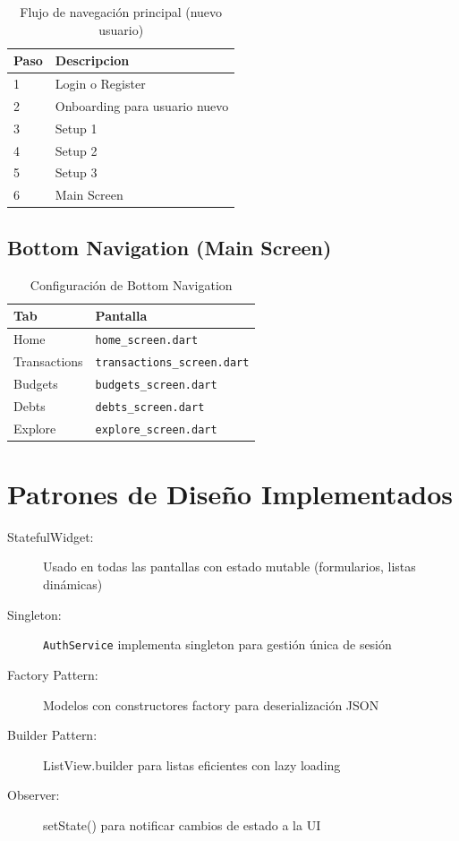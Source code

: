 \begin{table}[H]
\centering
\begin{tabularx}{\textwidth}{|l|X|}
\hline
\textbf{Paso} & \textbf{Descripcion} \\
\hline
1 & Login o Register \\
\hline
2 & Onboarding para usuario nuevo \\
\hline
3 & Setup 1 \\
\hline
4 & Setup 2 \\
\hline
5 & Setup 3 \\
\hline
6 & Main Screen \\
\hline
\end{tabularx}
\caption{Flujo de navegación principal (nuevo usuario)}
\label{fig:flujo_navegacion}
\end{table}

\subsection{Bottom Navigation (Main Screen)}

\begin{table}[H]
\centering
\begin{tabularx}{\textwidth}{|>{\centering\arraybackslash}p{2.4cm}|X|}
\hline
\textbf{Tab} & \textbf{Pantalla} \\
\hline
Home & \texttt{home\_screen.dart} \\
\hline
Transactions & \texttt{transactions\_screen.dart} \\
\hline
Budgets & \texttt{budgets\_screen.dart} \\
\hline
Debts & \texttt{debts\_screen.dart} \\
\hline
Explore & \texttt{explore\_screen.dart} \\
\hline
\end{tabularx}
\caption{Configuración de Bottom Navigation}
\end{table}

\section{Patrones de Diseño Implementados}

\begin{description}
    \item[StatefulWidget:] Usado en todas las pantallas con estado mutable (formularios, listas dinámicas)
    \item[Singleton:] \texttt{AuthService} implementa singleton para gestión única de sesión
    \item[Factory Pattern:] Modelos con constructores factory para deserialización JSON
    \item[Builder Pattern:] ListView.builder para listas eficientes con lazy loading
    \item[Observer:] setState() para notificar cambios de estado a la UI
\end{description}
